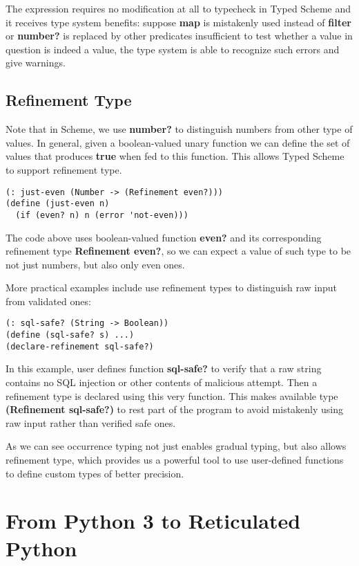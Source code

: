 The expression requires no modification at all to typecheck in Typed Scheme
and it receives type system benefits: suppose \textbf{map} is mistakenly
used instead of \textbf{filter} or \textbf{number?} is replaced by
other predicates insufficient to test whether a value in question is indeed a value,
the type system is able to recognize such errors and give warnings.

\subsection{Refinement Type}

Note that in Scheme, we use \textbf{number?} to distinguish numbers
from other type of values.
In general, given a boolean-valued unary function
we can define the set of values that produces \textbf{true} when fed to this function.
This allows Typed Scheme to support refinement type.

\begin{verbatim}
(: just-even (Number -> (Refinement even?)))
(define (just-even n)
  (if (even? n) n (error 'not-even)))
\end{verbatim}

The code above uses boolean-valued function \textbf{even?}
and its corresponding refinement type \textbf{Refinement even?},
so we can expect a value of such type to be not just numbers, but also only even ones.

More practical examples include use refinement types to distinguish raw input
from validated ones:

\begin{verbatim}
(: sql-safe? (String -> Boolean))
(define (sql-safe? s) ...)
(declare-refinement sql-safe?)
\end{verbatim}

In this example, user defines function \textbf{sql-safe?} to verify
that a raw string contains no SQL injection or other contents of malicious attempt.
Then a refinement type is declared using this very function.
This makes available type \textbf{(Refinement sql-safe?)} to rest part of the program
to avoid mistakenly using raw input rather than verified safe ones.

As we can see occurrence typing not just enables
gradual typing, but also allows refinement type,
which provides us a powerful tool to use user-defined functions
to define custom types of better precision.

\section{From Python 3 to Reticulated Python}

